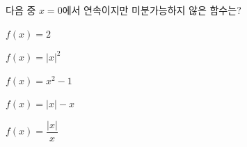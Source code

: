다음 중 $x=0$에서 연속이지만 미분가능하지 않은 함수는?
\begin{choices32}{\rule[-3ex]{0pt}{8ex}$f(x)=2$}{\rule[-3ex]{0pt}{8ex}$f(x)=|x|^2$}{\rule[-3ex]{0pt}{8ex}$f(x)=x^2-1$}{\rule[-3ex]{0pt}{8ex}$f(x)=|x|-x$}{\rule[-3ex]{0pt}{8ex}$f(x)=\dfrac{|x|}{x}$}\end{choices32}

